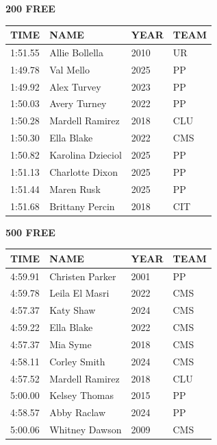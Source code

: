 \begin{table}[H]
\centering
\begin{minipage}[t]{0.48\textwidth}
\centering
\textbf{200 FREE}\\[0.1cm]
\begin{tabular}{@{}p{1.8cm}p{2.8cm}p{1.2cm}p{1.4cm}@{}}
\hline
    \textbf{TIME} & \textbf{NAME} & \textbf{YEAR} & \textbf{TEAM} \\
\hline
    1:51.55 & Allie Bollella & 2010 & UR \\
    1:49.78 & Val Mello & 2025 & PP \\
    1:49.92 & Alex Turvey & 2023 & PP \\
    1:50.03 & Avery Turney & 2022 & PP \\
    1:50.28 & Mardell Ramirez & 2018 & CLU \\
    1:50.30 & Ella Blake & 2022 & CMS \\
    1:50.82 & Karolina Dzieciol & 2025 & PP \\
    1:51.13 & Charlotte Dixon & 2025 & PP \\
    1:51.44 & Maren Rusk & 2025 & PP \\
    1:51.68 & Brittany Percin & 2018 & CIT \\
\hline
\end{tabular}
\end{minipage}\hfill
\begin{minipage}[t]{0.48\textwidth}
\centering
\textbf{500 FREE}\\[0.1cm]
\begin{tabular}{@{}p{1.8cm}p{2.8cm}p{1.2cm}p{1.4cm}@{}}
\hline
    \textbf{TIME} & \textbf{NAME} & \textbf{YEAR} & \textbf{TEAM} \\
\hline
    4:59.91 & Christen Parker & 2001 & PP \\
    4:59.78 & Leila El Masri & 2022 & CMS \\
    4:57.37 & Katy Shaw & 2024 & CMS \\
    4:59.22 & Ella Blake & 2022 & CMS \\
    4:57.37 & Mia Syme & 2018 & CMS \\
    4:58.11 & Corley Smith & 2024 & CMS \\
    4:57.52 & Mardell Ramirez & 2018 & CLU \\
    5:00.00 & Kelsey Thomas & 2015 & PP \\
    4:58.57 & Abby Raclaw & 2024 & PP \\
    5:00.06 & Whitney Dawson & 2009 & CMS \\
\hline
\end{tabular}
\end{minipage}
\end{table}

